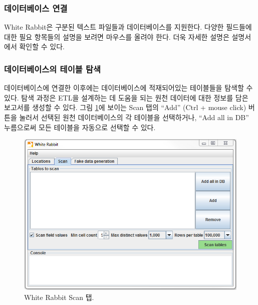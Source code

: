 \documentclass[11pt]{book}
\theoremstyle{definition}
\theoremstyle{definition}
\theoremstyle{definition}
\theoremstyle{remark}
\begin{document}
\subsubsection*{데이터베이스 연결}\label{-}

White Rabbit은 구분된 텍스트 파일들과 데이터베이스를 지원한다. 다양한
필드들에 대한 필요 항목들의 설명을 보려면 마우스를 올려야 한다. 더욱
자세한 설명은 설명서에서 확인할 수 있다.

\subsubsection*{데이터베이스의 테이블 탐색}\label{--}

데이터베이스에 연결한 이후에는 데이터베이스에 적재되어있는 테이블들을
탐색할 수 있다. 탐색 과정은 ETL을 설계하는 데 도움을 되는 원천 데이터에
대한 정보를 담은 보고서를 생성할 수 있다. 그림
\ref{fig:WhiteRabbitAddTables}에 보이는 Scan 탭의 ``Add'' (Ctrl + mouse
click) 버튼을 눌러서 선택된 원천 데이터베이스의 각 테이블을 선택하거나,
``Add all in DB'' 누름으로써 모든 테이블을 자동으로 선택할 수 있다.

\begin{figure}

{\centering \includegraphics[width=1\linewidth]{images/ExtractTransformLoad/WhiteRabbitAddTables} 

}

\caption{White Rabbit Scan 탭.}\label{fig:WhiteRabbitAddTables}
\end{figure}
\end{document}
